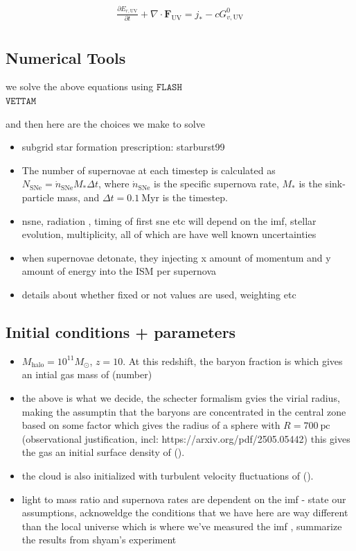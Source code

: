 \documentclass[twocolumn,linenumbers]{aastex631}
\begin{document}
\begin{align}
    \frac{\partial E_{r, \text{UV}}}{\partial t} + \nabla \cdot \mathbf{F}_{\text{UV}} = j_* - cG^0_{v, \text{UV}} \\
\end{align}


\subsection{Numerical Tools}
we solve the above equations using $\mathtt{FLASH}$ \citep{2000ApJS..131..273F,2008PhST..132a4046D}\\
$\mathtt{VETTAM}$\cite{2022MNRAS.512..401M}

and then here are the choices we make to solve
\begin{itemize}
    \item subgrid star formation prescription: starburst99
    \item  The number of supernovae at each timestep is calculated as 
$ N_\mathrm{SNe} = \dot{n}_\mathrm{SNe} M_* \Delta t$, where $\dot{n}_\mathrm{SNe}$ is the specific supernova rate, $M_*$ is the sink-particle mass, and $\Delta t = 0.1\ \mathrm{Myr}$ is the timestep. 
    \item nsne, radiation , timing of first sne etc will depend on the imf, stellar evolution, multiplicity, all of which are have well known uncertainties
    \item when supernovae detonate, they injecting x amount of momentum and y amount of energy into the ISM per supernova 
    \item details about whether fixed or not values are used, weighting etc
    \end{itemize}

\subsection{Initial conditions + parameters}
\begin{itemize}
    \item $M_\mathrm{halo} = 10^{11} M_\odot$, $z=10$. At this redshift, the baryon fraction is  which gives an intial gas mass of (number) 
    \item the above is what we decide, the schecter formalism gvies the virial radius, making the assumptin that the baryons are concentrated in the central zone based on some factor which gives the radius of a sphere with $R=700\ \mathrm{pc}$ (observational justification, incl: https://arxiv.org/pdf/2505.05442) this gives the gas an initial surface density of ().  
    \item the cloud is also initialized with turbulent velocity fluctuations of ().
    \item light to mass ratio and supernova rates are dependent on the imf - state our assumptions, acknoweldge the conditions that we have here are way different than the local universe which is where we've measured the imf , summarize the results from shyam's experiment
    \end{itemize}
\end{document}
